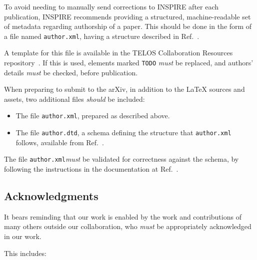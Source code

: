 \documentclass{article}
\newcommand\rfcword[1]{\emph{#1}\xspace}
\newcommand\must{\rfcword{must}}
\newcommand\should{\rfcword{should}}
\newcommand\filename[1]{\texttt{#1}\xspace}
\newcommand\authorxml{\filename{author.xml}\xspace}
\begin{document}
To avoid needing to manually send corrections to INSPIRE after each publication,
INSPIRE recommends providing
a structured, machine-readable set of metadata regarding authorship of a paper.
This should be done in the form of a file named \authorxml,
having a structure described in Ref.~\cite{inspire-authorxml}.

A template for this file is available in the TELOS Collaboration Resources repository~\cite{resources}.
If this is used,
elements marked \verb|TODO| \must be replaced,
and authors' details \must be checked,
before publication.

When preparing to submit to the arXiv,
in addition to the LaTeX sources and assets,
two additional files \should be included:

\begin{itemize}
  \item
        The file \authorxml,
        prepared as described above.
  \item
        The file \filename{author.dtd},
        a schema defining the structure that \authorxml follows,
        available from Ref.~\cite{inspire-authorxml}.
\end{itemize}

The file \authorxml \must be validated for correctness against the schema,
by following the instructions in the documentation at Ref.~\cite{inspire-authorxml}.

\subsection{Acknowledgments}\label{sec:acknowledge}

It bears reminding that our work is enabled by
the work and contributions of many others outside our collaboration,
who \must be appropriately acknowledged in our work.

This includes:
\end{document}
